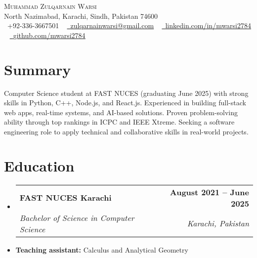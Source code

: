 \documentclass[letterpaper,11pt]{article}
\makeatletter
\newcommand{\resumeItem}[1]{
  \item\small{
    {#1 \vspace{-2pt}}
  }
}
\newcommand{\resumeSubheading}[4]{
  \vspace{-2pt}\item
    \begin{tabular*}{1.0\textwidth}[t]{l@{\extracolsep{\fill}}r}
      \textbf{#1} & \textbf{\small #2} \\
      \textit{\small#3} & \textit{\small #4} \\
    \end{tabular*}\vspace{-7pt}
}
\newcommand{\resumeSubHeadingListStart}{\begin{itemize}[leftmargin=0.0in, label={}]}
\newcommand{\resumeSubHeadingListEnd}{\end{itemize}}
\makeatother
\begin{document}

\begin{center}
    {\Huge \scshape Muhammad Zulqarnain Warsi} \\ \vspace{1pt}
    North Nazimabad, Karachi, Sindh, Pakistan 74600 \\ \vspace{1pt}
    \small \raisebox{-0.1\height}\faPhone\ +92-336-3667501 ~ \href{mailto:zulqarnainwarsi@gmail.com}{\raisebox{-0.2\height}\faEnvelope\  \underline{zulqarnainwarsi@gmail.com}} ~ 
    \href{https://linkedin.com/in/mwarsi2784/}{\raisebox{-0.2\height}\faLinkedin\ \underline{linkedin.com/in/mwarsi2784}}  ~
    \href{https://github.com/mwarsi2784}{\raisebox{-0.2\height}\faGithub\ \underline{github.com/mwarsi2784}}
    \vspace{-8pt}
\end{center}










\section{Summary}
\small{
Computer Science student at FAST NUCES (graduating June 2025) with strong skills in Python, C++, Node.js, and React.js. Experienced in building full-stack web apps, real-time systems, and AI-based solutions. Proven problem-solving ability through top rankings in ICPC and IEEE Xtreme. Seeking a software engineering role to apply technical and collaborative skills in real-world projects.
}
\vspace{-5pt}











\section{Education}
  \resumeSubHeadingListStart
    \resumeSubheading
      {FAST NUCES Karachi}{August 2021 -- June 2025}
      {Bachelor of Science in Computer Science}{Karachi, Pakistan}
      \resumeItem{\textbf{Teaching assistant:} Calculus and Analytical Geometry}
  \resumeSubHeadingListEnd
\end{document}

